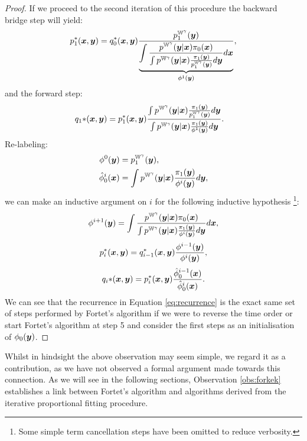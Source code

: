 \documentclass[a4paper,12pt,twoside,openright]{report}
\theoremstyle{definition}
\begin{document}
\begin{proof}
If we proceed to the second iteration of this procedure the backward bridge step will yield:
\begin{align}
    p_1^{*} ({\bm{x}}, {\bm{y}}) =  q_0^{*} ({\bm{x}}, {\bm{y}}) \frac{p^{\mathbb{W}^{\gamma}}_1({\bm{y}})}{ \underbrace{\displaystyle\int \frac{p^{\mathbb{W}^{\gamma}}({\bm{y}}| {\bm{x}})\pi_0({\bm{x}})}{\int p^{\mathbb{W}^{\gamma}}({\bm{y}}| {\bm{x}}) \frac{\pi_1({\bm{y}})}{p^{\mathbb{W}^{\gamma}}_1({\bm{y}})} d{\bm{y}}}d{\bm{x}}}_{{\phi}^{1}({\bm{y}})}} ,
\end{align}
and the forward step:
\begin{align}
    q_1{*} ({\bm{x}}, {\bm{y}}) &= p_1^{*} ({\bm{x}}, {\bm{y}}) \frac{\int    p^{\mathbb{W}^{\gamma}}({\bm{y}}| {\bm{x}}) \frac{\pi_1({\bm{y}})}{p^{\mathbb{W}^{\gamma}}_1({\bm{y}})}  d {\bm{y}}}{\int    p^{\mathbb{W}^{\gamma}}({\bm{y}}| {\bm{x}}) \frac{\pi_1({\bm{y}})}{{\phi}^{1}({\bm{y}})}  d {\bm{y}}}.
\end{align}
Re-labeling: 
\begin{align}
    \phi^0({\bm{y}})&=p^{\mathbb{W}^{\gamma}}_1({\bm{y}}), \\ 
    \hat{\phi}_0^{i}({\bm{x}}) &= \int  p^{\mathbb{W}^{\gamma}}({\bm{y}}| {\bm{x}}) \frac{\pi_1({\bm{y}})}{{\phi}^{i}({\bm{y}})}  d {\bm{y}},
\end{align}
we can make an inductive argument on $i$ for the following inductive hypothesis \footnote{Some simple term cancellation steps have been omitted to reduce verbosity.}:
\begin{align} \label{eq:recurrence}
  {\phi}^{i+1}({\bm{y}}) =  \displaystyle\int \frac{p^{\mathbb{W}^{\gamma}}({\bm{y}}| {\bm{x}})\pi_0({\bm{x}})}{\int p^{\mathbb{W}^{\gamma}}({\bm{y}}| {\bm{x}}) \frac{\pi_1({\bm{y}})}{\phi^i({\bm{y}})} d{\bm{y}}}d{\bm{x}},
 \end{align}
 \begin{align}
  p_i^{*} ({\bm{x}}, {\bm{y}}) =   q_{i-1}^{*} ({\bm{x}}, {\bm{y}}) \frac{\phi^{i-1}({\bm{y}})}{{\phi}^{i}({\bm{y}})} ,
\end{align}
 \begin{align}
      q_i{*} ({\bm{x}}, {\bm{y}}) =     p_i^{*} ({\bm{x}}, {\bm{y}}) \frac{\hat{\phi}_0^{i-1}({\bm{x}})}{\hat{\phi}_0^{i}({\bm{x}})} .
\end{align}
We can see that the  recurrence in Equation \ref{eq:recurrence} is the exact same set of steps performed by Fortet's algorithm if we were to reverse the time order or start Fortet's algorithm at step 5 and consider the first steps  as an initialisation of $\phi_0({\bm{y}})$.
\end{proof}

Whilst in hindsight the above observation may seem simple, we regard it as a contribution, as we have not observed a formal argument made towards this connection. As we will see in the following sections, Observation \ref{obs:forkek} establishes a link between Fortet's algorithm and algorithms derived from the iterative proportional fitting procedure.
\end{document}
